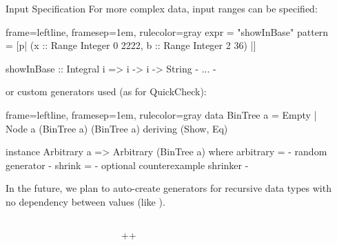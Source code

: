 \documentclass[final, 20pt, a0]{beamer}
\newlength{\sepwid}
\newlength{\marginwid}
\newlength{\onecolwid}
\newlength{\twocolwid}
\begin{document}
\begin{frame}[t,fragile]
\begin{columns}[t]
\begin{column}{\twocolwid}
\begin{block}{Input Specification}
  For more complex data, input ranges can be specified:
  \begin{hscode*}{frame=leftline, framesep=1em, rulecolor=gray}
    expr = "showInBase"
    pattern = [p| (x :: Range Integer 0 2222, b :: Range Integer 2 36) |]

    showInBase :: Integral i => i -> i -> String
    {- ... -}
  \end{hscode*}

  or custom generators used (as for QuickCheck):
  \begin{hscode*}{frame=leftline, framesep=1em, rulecolor=gray}
    data BinTree a = Empty | Node a (BinTree a) (BinTree a)
                     deriving (Show, Eq)

    instance Arbitrary a => Arbitrary (BinTree a) where
        arbitrary = {- random generator -}
        shrink = {- optional counterexample shrinker -}
  \end{hscode*}

  In the future, we plan to auto-create generators for recursive data types with no dependency between values (like ).
\end{block}

\end{column} %

\begin{column}{\marginwid}\end{column} %

\end{columns}
\begin{columns}[t] %

\begin{column}{\marginwid}\end{column} %
\begin{column}{\onecolwid+\sepwid+\twocolwid}


\end{column}

\begin{column}{\marginwid}\end{column} %

\end{columns}

\end{frame}
\end{document}
